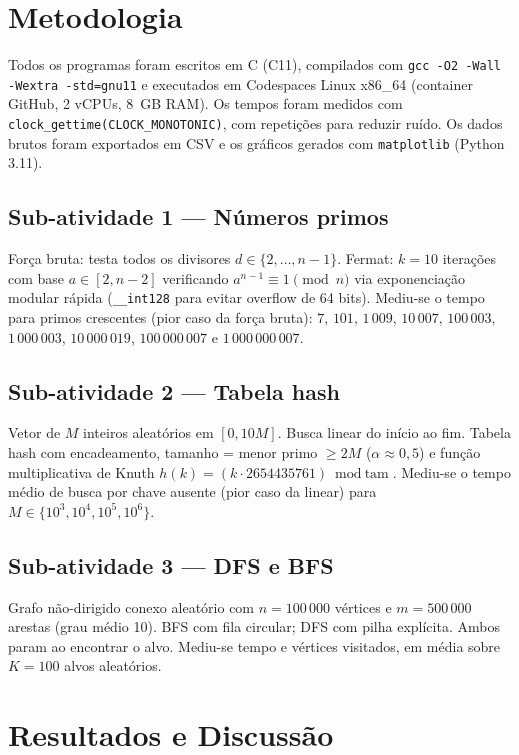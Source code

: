 \documentclass{SBCbookchapter}
\begin{document}
\section{Metodologia}
\label{sec:metodologia}
Todos os programas foram escritos em C (C11), compilados com
\texttt{gcc -O2 -Wall -Wextra -std=gnu11} e executados em Codespaces
Linux x86\_64 (container GitHub, 2 vCPUs, 8~GB RAM). Os tempos foram
medidos com \texttt{clock\_gettime(CLOCK\_MONOTONIC)}, com repetições
para reduzir ruído. Os dados brutos foram exportados em CSV e os
gráficos gerados com \texttt{matplotlib} (Python 3.11).

\subsection{Sub-atividade 1 --- Números primos}
Força bruta: testa todos os divisores $d \in \{2,\dots,n-1\}$. Fermat:
$k=10$ iterações com base $a \in [2,n-2]$ verificando
$a^{n-1} \equiv 1 \pmod{n}$ via exponenciação modular rápida
(\texttt{\_\_int128} para evitar overflow de 64 bits). Mediu-se o tempo
para primos crescentes (pior caso da força bruta): $7$, $101$,
$1\,009$, $10\,007$, $100\,003$, $1\,000\,003$, $10\,000\,019$,
$100\,000\,007$ e $1\,000\,000\,007$.

\subsection{Sub-atividade 2 --- Tabela hash}
Vetor de $M$ inteiros aleatórios em $[0,10M]$. Busca linear do início ao
fim. Tabela hash com encadeamento, tamanho = menor primo $\ge 2M$
($\alpha \approx 0{,}5$) e função multiplicativa de Knuth
$h(k) = (k \cdot 2654435761) \bmod \text{tam}$. Mediu-se o tempo médio
de busca por chave ausente (pior caso da linear) para
$M \in \{10^3, 10^4, 10^5, 10^6\}$.

\subsection{Sub-atividade 3 --- DFS e BFS}
Grafo não-dirigido conexo aleatório com $n=100\,000$ vértices e
$m=500\,000$ arestas (grau médio 10). BFS com fila circular; DFS com
pilha explícita. Ambos param ao encontrar o alvo. Mediu-se tempo e
vértices visitados, em média sobre $K=100$ alvos aleatórios.

\section{Resultados e Discussão}
\label{sec:resultados}
\end{document}
